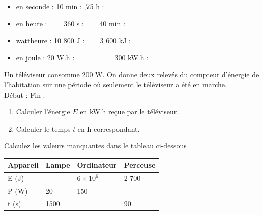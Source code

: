 \documentclass[11pt,a4paper]{article}
\newcommand{\cadreblanc}[1]{%
\medskip\framebox[\linewidth][c]{%
\rule{0mm}{#1mm}}\par
\medskip}
\begin{document}
\begin{itemize}
    \item en seconde : 10 min : ,75 h  :  \dotfill \\
\item en heure : ~~~~360 s : \dotfill ~~~ 40 min  :  \dotfill \\
\item wattheure : 10 800 J : \dotfill ~~~ 3 600 kJ : \dotfill \\
\item en joule : 20 W.h : \dotfill ~~~~~~~~~~ 300 kW.h : \dotfill 
\end{itemize}

\vfill 

 Un téléviseur consomme 200 W. On donne deux relevés du compteur d'énergie de l'habitation sur une période où seulement le téléviseur a été en marche. \\

\hfill Début :  \hfill Fin  :  \hspace{3cm} \\
\begin{multicols}{2}
    
\begin{enumerate}
    \item Calculer l'énergie $E$ en kW.h reçue par le téléviseur.\\[2mm]
    \cadreblanc{8}
    \item Calculer le temps $t$ en h correspondant. \\[6mm]
    \cadreblanc{8}
\end{enumerate}
\end{multicols}

\vfill 

 Calculez les valeurs manquantes dans le tableau ci-dessous \\\begin{center}
    

    \begin{tabular}{|p{3cm}|C{2cm}|C{2cm}|C{2cm}|}
         \hline
         Appareil & Lampe & Ordinateur & Perceuse \\
         \hline 
         E (J) &   & $6\times10^6$ & 2 700 \\
         \hline
         P (W) & 20 & 150 &  \\
         \hline 
         t (s) & 1500 &  & 90 \\
         \hline
         

    \end{tabular}\end{center}
\end{document}
